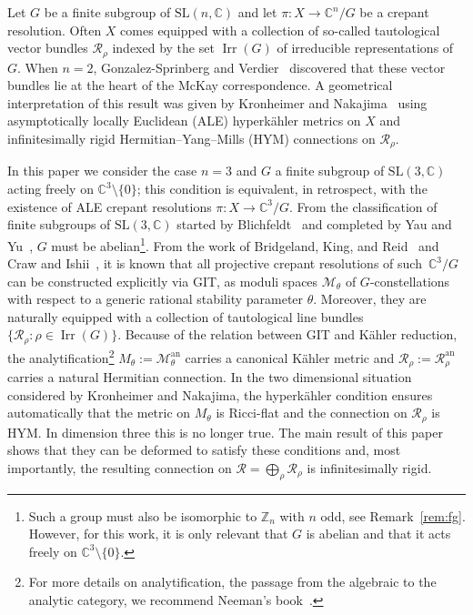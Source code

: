 \documentclass[pdftex]{sigma}
\numberwithin{equation}{section}
\newcommand{\cR}{\mathcal{R}}
\newcommand{\sM}{\mathscr{M}}
\newcommand{\sR}{\mathscr{R}}
\newcommand{\Z}{{\mathbb Z}}
\newcommand{\C}{{\mathbb C}}
\newcommand{\SL}{\mathrm{SL}}
\newcommand{\Irr}{\operatorname{Irr}}
\newcommand{\an}{\mathrm{an}}
\begin{document}
Let $G$ be a f\/inite subgroup of $\SL(n,\C)$ and let $\pi\colon X \to
\C^n\!/G$ be a crepant resolution.
Often $X$ comes equipped with a collection of so-called tautological vector
bundles $\sR_\rho$ indexed by the set $\Irr(G)$ of irreducible
representations of $G$.
When $n=2$,  Gonzalez-Sprinberg and Verdier~\cite{GonzalezSprinberg1983} discovered that these
vector bundles lie at the heart of the McKay
correspondence.
A geometrical interpretation of this result was given
by Kronheimer and Nakajima~\cite{Kronheimer1990} using asymptotically
locally Euclidean (ALE) hyperk\"ahler metrics on $X$ and inf\/initesimally
rigid Hermitian--Yang--Mills (HYM) connections on $\sR_\rho$.

In this paper we consider the case $n=3$ and $G$ a f\/inite subgroup of $\SL(3,\C)$ acting freely on $\C^3{\setminus} \{0\}$;
this condition is equivalent, in retrospect, with the existence of ALE crepant resolutions $\pi\colon X \to \C^3\!/G$.
From the classif\/ication of f\/inite subgroups of $\SL(3,\C)$ started by Blichfeldt~\cite{Blichfeldt1917} and completed by Yau and Yu~\cite{Yau-Stephan1993}, $G$ must be abelian\footnote{Such a group must also be isomorphic to $\Z_n$ with $n$ odd, see Remark~\ref{rem:fg}. However, for this work, it is only relevant that $G$ is abelian and that it acts freely on $\C^3{\setminus} \{0\}$.}.
From the work of Bridgeland, King, and Reid~\cite{Bridgeland2001} and Craw and
Ishii~\cite{Craw2004}, it is known that all projective crepant
resolutions of such~$\C^3\!/G$ can be constructed explicitly via GIT,
as moduli spaces $\sM_\theta$ of $G$-constellations with respect to a
generic rational stability parameter $\theta$.
Moreover, they are naturally equipped with a collection of tautological line bundles $\{ \sR_\rho\colon \rho \in \Irr(G) \}$.
Because of the relation between GIT and K\"ahler reduction, the
analytif\/ication\footnote{For
  more details on analytif\/ication, the passage from the algebraic to the analytic category, we recommend Neeman's book~\cite{Neeman2007}.} $M_\theta := \sM_\theta^\an$ carries a canonical
K\"ahler metric and $\cR_\rho := \sR_\rho^\an$ carries a natural
Hermitian connection.
In the two dimensional situation considered by Kronheimer and
Nakajima, the hyperk\"ahler condition ensures automatically that the
metric on $M_\theta$ is Ricci-f\/lat and the connection on $\cR_\rho$ is
HYM. In dimension three this is no longer true.
The main result of this paper shows that they can be deformed to satisfy these conditions and, most importantly, the resulting connection on $\cR = \bigoplus_\rho \cR_\rho$ is inf\/initesimally rigid.
\end{document}
